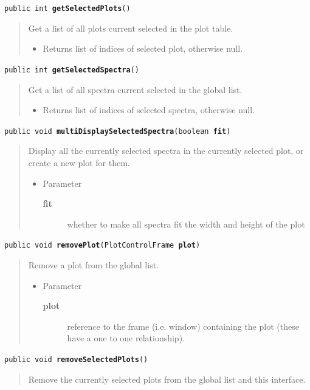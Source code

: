 \documentclass[twoside,11pt]{article}
\renewcommand{\_}{\texttt{\symbol{95}}}
\newcommand{\method}[1]{\texttt{#1}}
\newenvironment{desc}{\begin{quote}}{\end{quote}}
\begin{document}
\method{public int \textbf{getSelectedPlots}()\label{l360}\label{l361}}
\begin{desc}Get a list of all plots current selected in the plot table.
\begin{itemize}
\item{Returns list of indices of selected plot, otherwise null. }
\end{itemize}
\end{desc}

\method{public int \textbf{getSelectedSpectra}()\label{l362}\label{l363}}
\begin{desc}Get a list of all spectra current selected in the global list.
\begin{itemize}
\item{Returns list of indices of selected spectra, otherwise null. }
\end{itemize}
\end{desc}

\method{public void \textbf{multiDisplaySelectedSpectra}(\texttt{boolean} \textbf{fit})\label{l364}\label{l365}}
\begin{desc}Display all the currently selected spectra in the currently
 selected plot, or create a new plot for them.
\begin{itemize}
\item{Parameter
  \begin{description}
   \item[\textbf{fit}]{whether to make all spectra fit the width and height
            of the plot}
  \end{description}}
\end{itemize}
\end{desc}

\method{public void \textbf{removePlot}(\texttt{PlotControlFrame} \textbf{plot})\label{l366}\label{l367}}
\begin{desc}Remove a plot from the global list.
\begin{itemize}
\item{Parameter
  \begin{description}
   \item[\textbf{plot}]{reference to the frame (i.e. window) containing the
             plot (these have a one to one relationship).}
  \end{description}}
\end{itemize}
\end{desc}

\method{public void \textbf{removeSelectedPlots}()\label{l368}\label{l369}}
\begin{desc}Remove the currently selected plots from the global list and
 this interface.
\end{desc}
\end{document}
